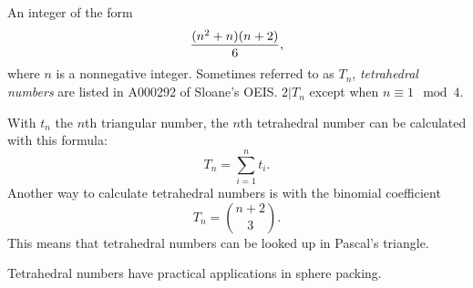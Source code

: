 \documentclass[12pt]{article}
\begin{document}
An integer of the form $${{(n^2 + n)(n + 2)} \over 6},$$ where $n$ is a nonnegative integer. Sometimes referred to as $T_n$, {\em tetrahedral numbers} are listed in A000292 of Sloane's OEIS. $2|T_n$ except when $n \equiv 1 \mod 4$.

With $t_n$ the $n$th triangular number, the $n$th tetrahedral number can be calculated with this formula: $$T_n = \sum_{i = 1}^n t_i.$$ Another way to calculate tetrahedral numbers is with the binomial coefficient $$T_n={n+2\choose3}.$$ This means that tetrahedral numbers can be looked up in Pascal's triangle.

Tetrahedral numbers have practical applications in sphere packing.
\end{document}
